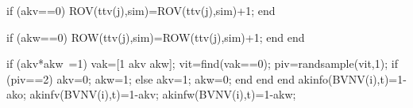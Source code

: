                                                           if (akv==0)
                                                             ROV(ttv(j),sim)=ROV(ttv(j),sim)+1;
                                                          end
                                                          
                                                          if (akw==0)
                                                             ROW(ttv(j),sim)=ROW(ttv(j),sim)+1;
                                                          end
                                                    end 
                                                     
                                                                if (akv*akw~=1)
                                                                       vak=[1 akv akw];
                                                                       vit=find(vak==0); 
                                                                       piv=randsample(vit,1);
                                                                       if (piv==2)
                                                                            akv=0;
                                                                            akw=1;
                                                                       else
                                                                            akv=1;
                                                                            akw=0;
                                                                       end                                                                       
                                                                end
                                          end
                                          akinfo(BVNV(i),t)=1-ako;
                                          akinfv(BVNV(i),t)=1-akv;
                                          akinfw(BVNV(i),t)=1-akw;
                                          
